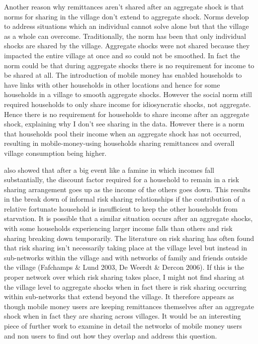 Another reason why remittances aren't shared after an aggregate shock is that norms for sharing in the village don't extend to aggregate shock. Norms develop to address situations which an individual cannot solve alone but that the village as a whole can overcome. Traditionally, the norm has been that only individual shocks are shared by the village. Aggregate shocks were not shared because they impacted the entire village at once and so could not be smoothed. In fact the norm could be that during aggregate shocks there is no requirement for income to be shared at all. The introduction of mobile money has enabled households to have links with other households in other locations and hence for some households in a village to smooth aggregate shocks. However the social norm still required households to only share income for idiosyncratic shocks, not aggregate. Hence there is no requirement for households to share income after an aggregate shock, explaining why I don't see sharing in the data. However there is a norm that households pool their income when an aggregate shock has not occurred, resulting in mobile-money-using households sharing remittances and overall village consumption being higher.

\cite{coate1993} also showed that after a big event like a famine in which incomes fall substantially, the discount factor required for a household to remain in a risk sharing arrangement goes up as the income of the others goes down. This results in the break down of informal risk sharing relationships if the contribution of a relative fortunate household is insufficient to keep the other households from starvation. It is possible that a similar situation occurs after an aggregate shocks, with some households experiencing larger income falls than others and risk sharing breaking down temporarily.     
The literature on risk sharing has often found that risk sharing isn't necessarily taking place at the village level but instead in sub-networks within the village and with networks of family and friends outside the village (Fafchamps \& Lund 2003, De Weerdt \& Dercon 2006). If this is the proper network over which risk sharing takes place, I might not find sharing at the village level to aggregate shocks when in fact there is risk sharing occurring within sub-networks that extend beyond the village. It therefore appears as though mobile money users are keeping remittances themselves after an aggregate shock when in fact they are sharing across villages. It would be an interesting piece of further work to examine in detail the networks of mobile money users and non users to find out how they overlap and address this question. 

